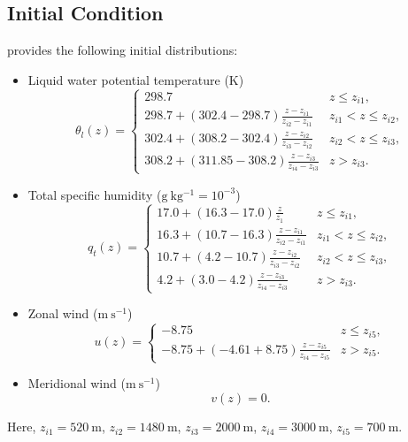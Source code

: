 \documentclass{report}
\begin{document}
\subsection{Initial Condition}

\cite{Siebesma2003} provides the following initial distributions:
\begin{itemize}
    \item Liquid water potential temperature (K)
\begin{equation}\label{e:bomex_init_thetal}
\theta_l(z) = 
    \begin{cases}
    298.7 & z\leq z_{i1},\\
    298.7 + (302.4-298.7)\frac{z - z_{i1}}{z_{i2} - z_{i1}} &  z_{i1} < z \leq z_{i2}, \\
    302.4 + (308.2-302.4)\frac{z - z_{i2}}{z_{i3} - z_{i2}} &  z_{i2} < z \leq z_{i3}, \\
    308.2 + (311.85-308.2)\frac{z - z_{i3}}{z_{i4} - z_{i3}} &  z > z_{i3}.
    \end{cases}
\end{equation}
\item Total specific humidity ($\mathrm{g~kg^{-1}}=10^{-3}$)
\begin{equation}\label{e:bomex_init_qt}
q_t(z) = 
    \begin{cases}
    17.0 + (16.3-17.0)\frac{z}{z_1} & z\leq z_{i1},\\
    16.3 + (10.7-16.3)\frac{z - z_{i1}}{z_{i2} - z_{i1}} &  z_{i1} < z \leq z_{i2}, \\
    10.7 + (4.2-10.7)\frac{z - z_{i2}}{z_{i3} - z_{i2}} &  z_{i2} < z \leq z_{i3}, \\
    4.2 + (3.0-4.2)\frac{z - z_{i3}}{z_{i4} - z_{i3}} &  z > z_{i3}.
    \end{cases}
\end{equation}
\item Zonal wind ($\mathrm{m~s^{-1}}$)
\begin{equation}\label{e:bomex_init_u}
u(z) = 
    \begin{cases}
    -8.75 & z\leq z_{i5},\\
    -8.75 + (-4.61+8.75)\frac{z - z_{i5}}{z_{i4}-z_{i5}} &  z > z_{i5}.
    \end{cases}
\end{equation}
\item Meridional wind ($\mathrm{m~s^{-1}}$)
\begin{equation}\label{e:bomex_init_v}
v(z) = 0.
\end{equation}
\end{itemize}
Here, $z_{i1}=520~\mathrm{m}$, $z_{i2}= 1480~\mathrm{m}$, $z_{i3}=2000~\mathrm{m}$, $z_{i4}= 3000~\mathrm{m}$, $z_{i5}=700~\mathrm{m}$.
\end{document}
